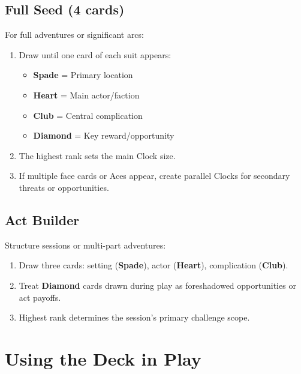 \subsection{Full Seed (4 cards)}
\label{subsec:full-seed}

For full adventures or significant arcs:
\begin{enumerate}
\item Draw until one card of each suit appears:
\begin{itemize}
    \item \textbf{Spade} = Primary location 
    \item \textbf{Heart} = Main actor/faction 
    \item \textbf{Club} = Central complication 
    \item \textbf{Diamond} = Key reward/opportunity 
\end{itemize}
\item The highest rank sets the main Clock size.
\item If multiple face cards or Aces appear, create parallel Clocks for secondary threats or opportunities.
\end{enumerate}

\subsection{Act Builder}
\label{subsec:act-builder}

Structure sessions or multi-part adventures:
\begin{enumerate}
\item Draw three cards: setting (\textbf{Spade}), actor (\textbf{Heart}), complication (\textbf{Club}).
\item Treat \textbf{Diamond} cards drawn during play as foreshadowed opportunities or act payoffs.
\item Highest rank determines the session's primary challenge scope.
\end{enumerate}

\section{Using the Deck in Play}
\label{sec:deck-in-play}

